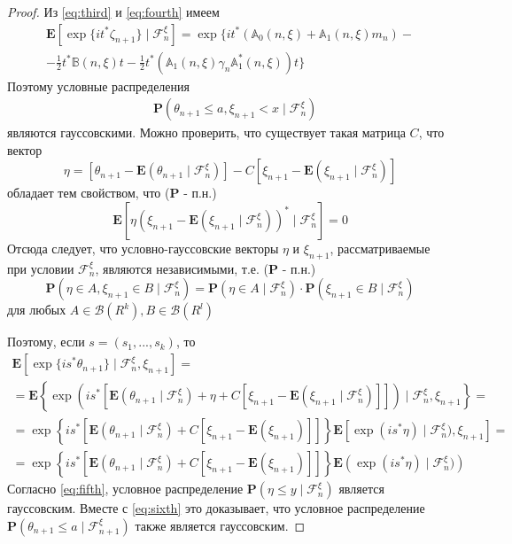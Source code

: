 \begin{proof}
	Из \eqref{eq:third} и \eqref{eq:fourth} имеем
	\begin{multline*}
	\mathbf{E} \left[ \exp\{ it^*\zeta_{n + 1}\} \mid \mathscr{F}^\xi_n\right] = \exp \bigg\{ it^* \left( \mathbb{A}_0(n, \xi) + \mathbb{A}_1(n, \xi)m_n\right) - \\
	- \frac{1}{2} t^* \mathbb{B}(n, \xi)t - \frac{1}{2} t^* \left(\mathbb{A}_1(n, \xi)\gamma_n \mathbb{A}_1^*(n, \xi) \right) t\bigg\}
	\end{multline*}
	Поэтому условные распределения
	\begin{align}
	\label{eq:fifth}
	& \mathbf{P} (\theta_{n + 1} \leqslant a, \xi_{n + 1} < x \mid \mathscr{F}_n^\xi)
	\end{align}
	являются гауссовскими.
	Можно проверить, что существует такая матрица $C$, что вектор
	$$\eta =  \left[\theta_{n + 1} - \mathbf{E} (\theta_{n + 1} \mid \mathscr{F}^\xi_n)\right] - C \left[\xi_{n + 1} - \mathbf{E} (\xi_{n + 1} \mid \mathscr{F}^\xi_n)\right]$$
	обладает тем свойством, что (\textbf{P} - п.н.)
	$$\mathbf{E} \left[\eta \left( \xi_{n + 1} - \mathbf{E}(\xi_{n + 1} \mid \mathscr{F}^\xi_n) \right)^* \mid \mathscr{F}^\xi_n \right] = 0$$
	Отсюда следует, что условно-гауссовские векторы $\eta$ и $\xi_{n + 1}$, рассматриваемые при условии $\mathscr{F}^\xi_n$, являются независимыми, т.е. (\textbf{P} - п.н.)
	$$\mathbf{P} (\eta \in A, \xi_{n + 1} \in B \mid \mathscr{F}^\xi_n) = \mathbf{P} (\eta \in A \mid \mathscr{F}^\xi_n) \cdot \mathbf{P} (\xi_{n + 1} \in B \mid \mathscr{F}^\xi_n)$$
	для любых $A \in \mathscr{B} (R^k), B \in \mathscr{B} (R^l)$
	
	Поэтому, если $s = (s_1, ..., s_k)$, то
	\begin{multline}
	\label{eq:sixth}
	\mathbf{E} \left[ \exp\{ is^*\theta_{n + 1}\} \mid \mathscr{F}^\xi_n, \xi_{n + 1}\right] = \\
	= \mathbf{E} \left\{ \exp\left( is^*\left[\mathbf{E}(\theta_{n + 1} \mid \mathscr{F}^\xi_n) + \eta + C \left[\xi_{n + 1} - \mathbf{E}(\xi_{n + 1} \mid \mathscr{F}^\xi_n)\right]\right]\right)\mid \mathscr{F}^\xi_n, \xi_{n + 1} \right\} = \\
	= \exp\left\{ is^*\left[\mathbf{E}(\theta_{n + 1} \mid \mathscr{F}^\xi_n) + C \left[\xi_{n + 1} - \mathbf{E}(\xi_{n + 1})\right]\right]\right\}\mathbf{E} \left[\exp(is^* \eta)\mid \mathscr{F}^\xi_n), \xi_{n + 1} \right] = \\
	= \exp\left\{ is^*\left[\mathbf{E}(\theta_{n + 1} \mid \mathscr{F}^\xi_n) + C \left[\xi_{n + 1} - \mathbf{E}(\xi_{n + 1})\right]\right]\right\}\mathbf{E} \left(\exp(is^* \eta)\mid \mathscr{F}^\xi_n) \right)
	\end{multline}
	Согласно \eqref{eq:fifth}, условное распределение $\mathbf{P} (\eta \leqslant y \mid \mathscr{F}^\xi_n)$ является гауссовским. Вместе с \eqref{eq:sixth} это доказывает, что условное распределение $\mathbf{P} (\theta_{n + 1} \leqslant a \mid \mathscr{F}^\xi_{n + 1})$ также является гауссовским.
\end{proof}

